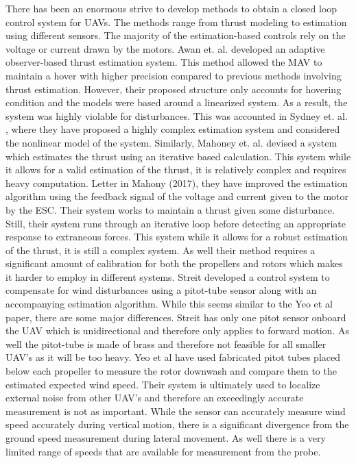 \documentclass[conference]{IEEEtran}
\begin{document}
There has been an enormous strive to develop methods to obtain a closed loop control system for UAVs. The methods range from thrust modeling to estimation using different sensors. The majority of the estimation-based controls rely on the voltage or current drawn by the motors.
Awan et. al. \cite{awan} developed an adaptive observer-based thrust estimation system. This method allowed the MAV to maintain a hover with higher precision compared to previous methods involving thrust estimation. However, their proposed structure only accounts for hovering condition and the models were based around a linearized system. As a result, the system was highly violable for disturbances. This was accounted in Sydney et. al. \cite{sydney}, where they have proposed a highly complex estimation system and considered the nonlinear model of the system. Similarly, Mahoney et. al. \cite{mahoney1} devised a system which estimates the thrust using an iterative based calculation. This system while it allows for a valid estimation of the thrust, it is relatively complex and requires heavy computation. Letter in Mahony (2017), they have improved the estimation algorithm using the feedback signal of the voltage and current given to the motor by the ESC. Their system works to maintain a thrust given some disturbance. Still, their system runs through an iterative loop before detecting an appropriate response to extraneous forces. This system while it allows for a robust estimation of the thrust, it is still a complex system. As well their method requires a significant amount of calibration for both the propellers and rotors which makes it harder to employ in different systems. Streit \cite{str} developed a control system to compensate for wind disturbances using a pitot-tube sensor along with an accompanying estimation algorithm. While this seems similar to the Yeo et al paper, there are some major differences. Streit has only one pitot sensor onboard the UAV which is unidirectional and therefore only applies to forward motion. As well the pitot-tube is made of brass and therefore not feasible for all smaller UAV’s as it will be too heavy. Yeo et al have used fabricated pitot tubes placed below each propeller to measure the rotor downwash and compare them to the estimated expected wind speed. Their system is ultimately used to localize external noise from other UAV’s and therefore an exceedingly accurate measurement is not as important. While the sensor can accurately measure wind speed accurately during vertical motion, there is a significant divergence from the ground speed measurement during lateral movement. As well there is a very limited range of speeds that are available for measurement from the probe.
\end{document}
